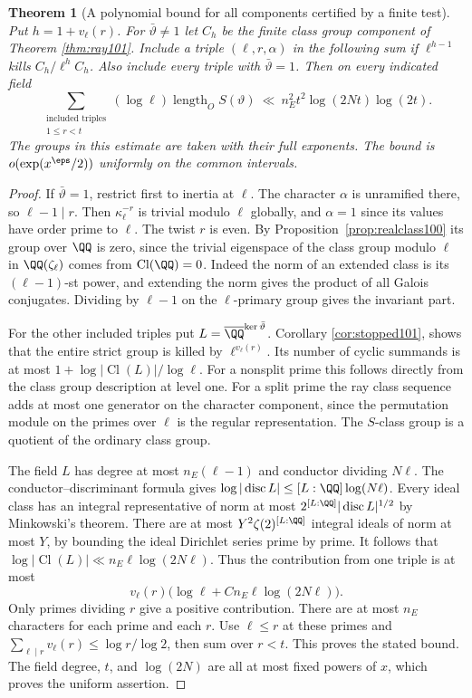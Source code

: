 \documentclass[a4paper,11pt]{article}
\newtheorem{theorem}[proposition]{Theorem}
\theoremstyle{definition}
\theoremstyle{remark}
\numberwithin{equation}{section}
\begin{document}
\begin{theorem}[A polynomial bound for all components certified by a finite test]
\label{thm:stable102}
Put \(h=1+v_\ell(r)\). For \(\bar\vartheta\ne1\) let \(C_h\) be
the finite class group component of Theorem \ref{thm:ray101}.
Include a triple \((\ell,r,\alpha)\) in the following sum if
\(\ell^{h-1}\) kills \(C_h/\ell^h C_h\). Also include every
triple with \(\bar\vartheta=1\). Then on every indicated field
\[
 \sum_{\substack{\text{included triples}\\1\le r<t}}
       (\log\ell)\operatorname{length}_{O} S(\vartheta)
       \ \ll\ n_E^2 t^2\log(2Nt)\log(2t).
\]
The groups in this estimate are taken with their full exponents.
The bound is \(o(\exp(x^\eps/2))\) uniformly on the common
intervals.
\end{theorem}
\begin{proof}
If \(\bar\vartheta=1\), restrict first to inertia at \(\ell\).
The character \(\alpha\) is unramified there, so \(\ell-1\mid r\).
Then \(\kappa_\ell^{-r}\) is trivial modulo \(\ell\) globally,
and \(\alpha=1\) since its values have order prime to \(\ell\).
The twist \(r\) is even. By Proposition~\ref{prop:realclass100}
its group over \(\QQ\) is zero, since the trivial eigenspace of the
class group modulo \(\ell\) in \(\QQ(\zeta_\ell)\) comes from
\(\operatorname{Cl}(\QQ)=0\). Indeed the norm of an extended
class is its \((\ell-1)\)-st power, and extending the norm gives
the product of all Galois conjugates. Dividing by \(\ell-1\)
on the \(\ell\)-primary group gives the invariant part.

For the other included triples put \(L=\overline\QQ^{\ker\bar\vartheta}\).
Corollary \ref{cor:stopped101}, shows that the entire strict group is
killed by \(\ell^{v_\ell(r)}\). Its number of cyclic summands is
at most \(1+\log|\operatorname{Cl}(L)|/\log\ell\).
For a nonsplit prime this follows directly from the class group
description at level one. For a split prime the ray class sequence
adds at most one generator on the character component, since
the permutation module on the primes over \(\ell\) is the regular
representation. The \(S\)-class group is a quotient of the
ordinary class group.

The field \(L\) has degree at most \(n_E(\ell-1)\) and conductor
dividing \(N\ell\). The conductor--discriminant formula gives
\(\log|\operatorname{disc}L|\le [L:\QQ]\log(N\ell)\).
Every ideal class has an integral representative of norm at most
\(2^{[L:\QQ]}|\operatorname{disc}L|^{1/2}\) by Minkowski's
theorem. There are at most \(Y^2\zeta(2)^{[L:\QQ]}\) integral
ideals of norm at most \(Y\), by bounding the ideal Dirichlet
series prime by prime. It follows that
\(\log|\operatorname{Cl}(L)|\ll n_E\ell\log(2N\ell)\).
Thus the contribution from one triple is at most
\[
   v_\ell(r)\bigl(\log\ell+C n_E\ell\log(2N\ell)\bigr).
\]
Only primes dividing \(r\) give a positive contribution. There
are at most \(n_E\) characters for each prime and each \(r\).
Use \(\ell\le r\) at these primes and
\(\sum_{\ell\mid r}v_\ell(r)\le\log r/\log2\), then sum over
\(r<t\). This proves the stated bound. The field degree, \(t\),
and \(\log(2N)\) are all at most fixed powers of \(x\), which
proves the uniform assertion.
\end{proof}
\end{document}
